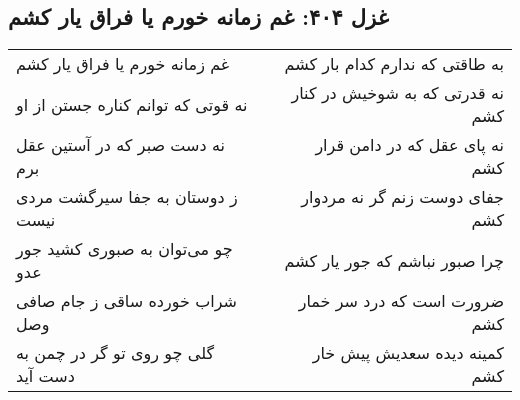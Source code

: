 \begin{center}
\section*{غزل ۴۰۴: غم زمانه خورم یا فراق یار کشم}
\label{sec:404}
\begin{longtable}{l p{0.5cm} r}
غم زمانه خورم یا فراق یار کشم
&&
به طاقتی که ندارم کدام بار کشم
\\
نه قوتی که توانم کناره جستن از او
&&
نه قدرتی که به شوخیش در کنار کشم
\\
نه دست صبر که در آستین عقل برم
&&
نه پای عقل که در دامن قرار کشم
\\
ز دوستان به جفا سیرگشت مردی نیست
&&
جفای دوست زنم گر نه مردوار کشم
\\
چو می‌توان به صبوری کشید جور عدو
&&
چرا صبور نباشم که جور یار کشم
\\
شراب خورده ساقی ز جام صافی وصل
&&
ضرورت است که درد سر خمار کشم
\\
گلی چو روی تو گر در چمن به دست آید
&&
کمینه دیده سعدیش پیش خار کشم
\\
\end{longtable}
\end{center}
